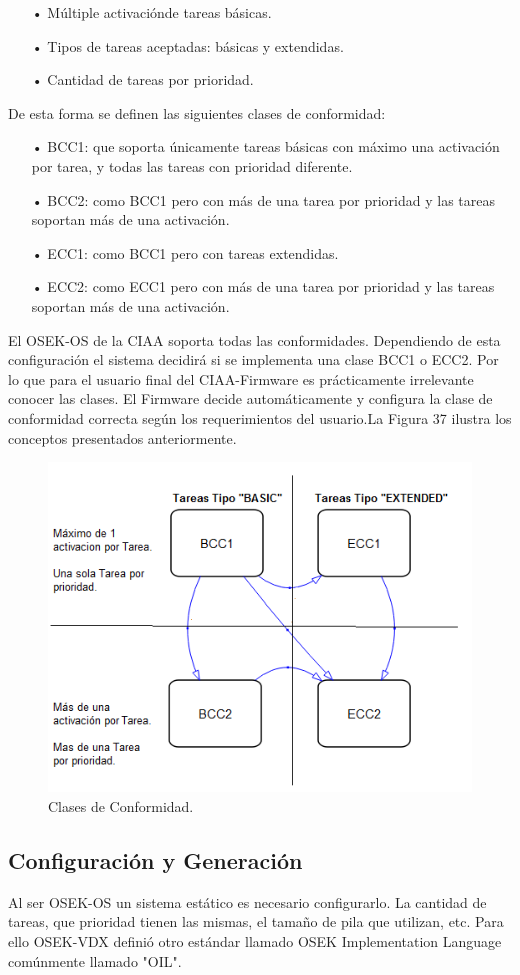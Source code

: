 \documentclass[12pt,letterpaper]{article}
\begin{document}
\begin{enumerate}
\item[•]Múltiple activaciónde tareas básicas.
\item[•]Tipos de tareas aceptadas: básicas y extendidas.
\item[•]Cantidad de tareas por prioridad.
\end{enumerate}

De esta forma se definen las siguientes clases de conformidad:
\begin{enumerate}
\item[•]BCC1: que soporta únicamente tareas  básicas con máximo una activación por tarea, y todas las tareas con prioridad diferente.
\item[•]BCC2: como  BCC1 pero con más de una tarea por prioridad y las tareas soportan más de una activación.
\item[•]ECC1: como BCC1 pero con tareas extendidas.
\item[•]ECC2: como  ECC1 pero con más de una tarea por prioridad y las tareas soportan más de una activación.
\end{enumerate}
El OSEK-OS de la CIAA soporta todas las conformidades. Dependiendo de esta configuración el sistema decidirá si se implementa una clase BCC1 o ECC2. Por lo que para el usuario final del CIAA-Firmware es prácticamente irrelevante conocer las clases. El Firmware decide automáticamente y configura la clase de conformidad correcta según los requerimientos del usuario.La Figura 37 ilustra los conceptos presentados anteriormente.


\begin{figure}[!h]
\centering
\includegraphics[width=8 cm]{figuras/f17.png}
\caption{Clases de Conformidad.}
\label{Fig34}
\end{figure}

\subsection{Configuración y Generación}\label{sec:generacionoil}
Al ser OSEK-OS un sistema estático es necesario configurarlo. La cantidad de tareas, que prioridad tienen las mismas, el tamaño de pila que utilizan, etc. Para ello OSEK-VDX definió otro estándar llamado OSEK Implementation Language comúnmente llamado "OIL".
\end{document}
